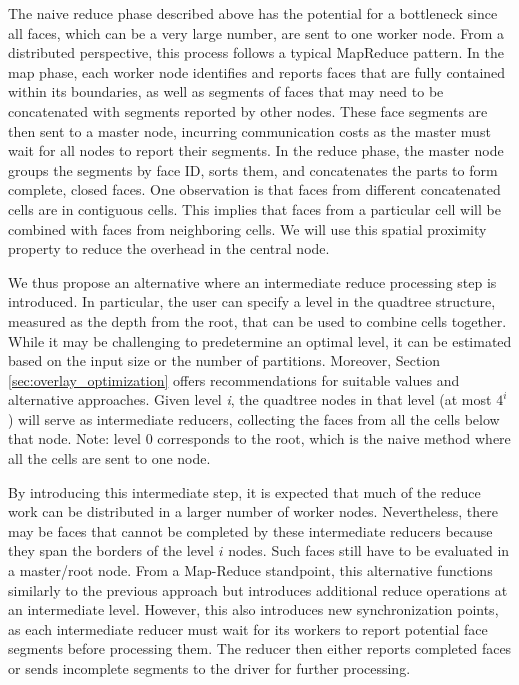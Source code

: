 The naive reduce phase described above has the potential for a bottleneck since all faces, which can be a very large number, are sent to one worker node. From a distributed perspective, this process follows a typical MapReduce pattern. In the map phase, each worker node identifies and reports faces that are fully contained within its boundaries, as well as segments of faces that may need to be concatenated with segments reported by other nodes. These face segments are then sent to a master node, incurring communication costs as the master must wait for all nodes to report their segments. In the reduce phase, the master node groups the segments by face ID, sorts them, and concatenates the parts to form complete, closed faces.  One observation is that faces from different concatenated cells are in contiguous cells. This implies that faces from a particular cell will be combined with faces from neighboring cells. We will use this spatial proximity property to reduce the overhead in the central node.

We thus propose an alternative where an intermediate reduce processing step is introduced. In particular, the user can specify a level in the quadtree structure, measured as the depth from the root, that can be used to combine cells together.  While it may be challenging to predetermine an optimal level, it can be estimated based on the input size or the number of partitions. Moreover, Section \ref{sec:overlay_optimization} offers recommendations for suitable values and alternative approaches.  Given level \textit{i}, the quadtree nodes in that level (at most $4^i$) will serve as intermediate reducers, collecting the faces from all the cells below that node. Note: level 0 corresponds to the root, which is the naive method where all the cells are sent to one node.

By introducing this intermediate step, it is expected that much of the reduce work can be distributed in a larger number of worker nodes. Nevertheless, there may be faces that cannot be completed by these intermediate reducers because they span the borders of the level $i$ nodes. Such faces still have to be evaluated in a master/root node.  From a Map-Reduce standpoint, this alternative functions similarly to the previous approach but introduces additional reduce operations at an intermediate level. However, this also introduces new synchronization points, as each intermediate reducer must wait for its workers to report potential face segments before processing them. The reducer then either reports completed faces or sends incomplete segments to the driver for further processing.

